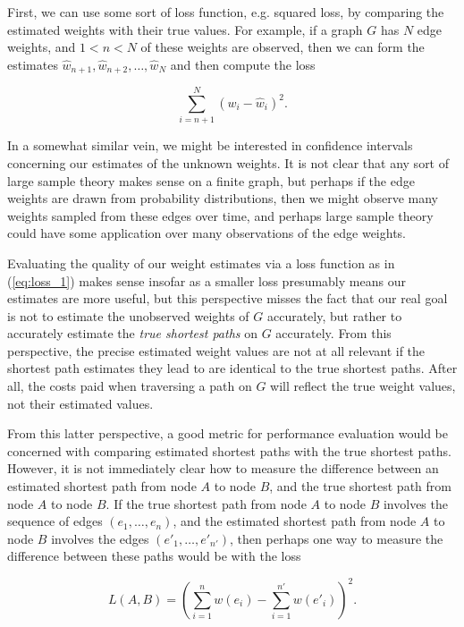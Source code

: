 First, we can use some sort of loss function, e.g. squared loss, by comparing the estimated weights with their true values. For example, if a graph $G$ has $N$ edge weights, and $1 < n < N$ of these weights are observed, then we can form the estimates $\hat w_{n + 1}, \hat w_{n + 2}, \dots, \hat w_N$ and then compute the loss

\begin{equation}\label{eq:loss_1}
    \sum_{i = n + 1}^N \left(w_i - \hat w_i\right)^2.
\end{equation}

In a somewhat similar vein, we might be interested in confidence intervals concerning our estimates of the unknown weights. It is not clear that any sort of large sample theory makes sense on a finite graph, but perhaps if the edge weights are drawn from probability distributions, then we might observe many weights sampled from these edges over time, and perhaps large sample theory could have some application over many observations of the edge weights.

Evaluating the quality of our weight estimates via a loss function as in (\ref{eq:loss_1}) makes sense insofar as a smaller loss presumably means our estimates are more useful, but this perspective misses the fact that our real goal is not to estimate the unobserved weights of $G$ accurately, but rather to accurately estimate the \textit{true shortest paths} on $G$ accurately. From this perspective, the precise estimated weight values are not at all relevant if the shortest path estimates they lead to are identical to the true shortest paths. After all, the costs paid when traversing a path on $G$ will reflect the true weight values, not their estimated values.

From this latter perspective, a good metric for performance evaluation would be concerned with comparing estimated shortest paths with the true shortest paths. However, it is not immediately clear how to measure the difference between an estimated shortest path from node $A$ to node $B$, and the true shortest path from node $A$ to node $B$. If the true shortest path from node $A$ to node $B$ involves the sequence of edges $(e_1, \dots, e_n)$, and the estimated shortest path from node $A$ to node $B$ involves the edges $(e'_1, \dots, e'_{n'})$, then perhaps one way to measure the difference between these paths would be with the loss

\[
    L(A, B) = \left(\sum_{i = 1}^n w(e_i) - \sum_{i = 1}^{n'} w(e'_i)\right)^2.
\]

